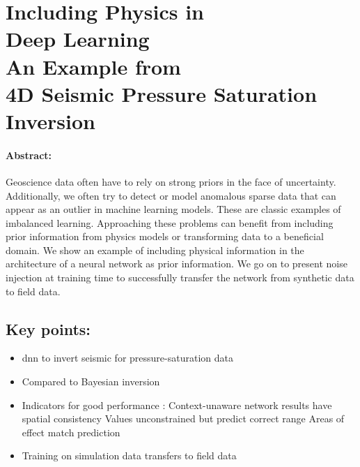 \section[Including Physics in Deep Learning – An Example from 4D Seismic Pressure Saturation Inversion]{Including Physics in\\Deep Learning\\An Example from\\4D Seismic Pressure Saturation Inversion}

\paragraph{Abstract:} Geoscience data often have to rely on strong priors in the face of uncertainty. Additionally, we often try to detect or model anomalous sparse data that can appear as an outlier in machine learning models. These are classic examples of imbalanced learning. Approaching these problems can benefit from including prior information from physics models or transforming data to a beneficial domain. We show an example of including physical information in the architecture of a neural network as prior information. We go on to present noise injection at training time to successfully transfer the network from synthetic data to field data.

\subsection*{Key points:}
\begin{itemize}
    \item \acl{dnn} to invert seismic for pressure-saturation data
    \item Compared to Bayesian inversion
    \item Indicators for good performance :
    \subitem Context-unaware network results have spatial consistency
    \subitem Values unconstrained but predict correct range
    \subitem Areas of effect match prediction
    \item Training on simulation data transfers to field data
\end{itemize}

{\vfill\hfill\newline{}}

